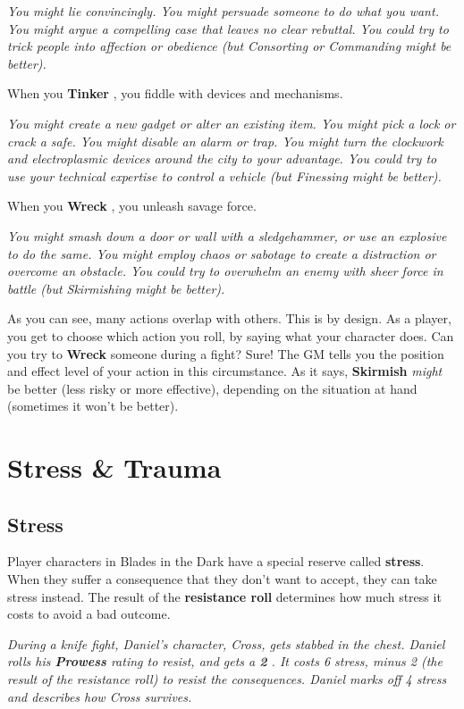 \documentclass[11pt,oneside]{book}
\newcommand{\gameterm}[1]{\textbf{#1}}
\begin{document}
\emph{You might lie convincingly. You might persuade someone to do what you want. You might argue a compelling case that leaves no clear rebuttal. You could try to trick people into affection or obedience (but Consorting or Commanding might be better).}

When you \gameterm{Tinker} , you fiddle with devices and mechanisms.

\emph{You might create a new gadget or alter an existing item. You might pick a lock or crack a safe. You might disable an alarm or trap. You might turn the clockwork and electroplasmic devices around the city to your advantage. You could try to use your technical expertise to control a vehicle (but Finessing might be better).}

When you \gameterm{Wreck} , you unleash savage force.

\emph{You might smash down a door or wall with a sledgehammer, or use an explosive to do the same. You might employ chaos or sabotage to create a distraction or overcome an obstacle. You could try to overwhelm an enemy with sheer force in battle (but Skirmishing might be better).}

As you can see, many actions overlap with others. This is by design. As a player, you get to choose which action you roll, by saying what your character does. Can you try to \gameterm{Wreck}  someone during a fight? Sure! The GM tells you the position and effect level of your action in this circumstance. As it says, \gameterm{Skirmish}  \emph{might} be better (less risky or more effective), depending on the situation at hand (sometimes it won’t be better).

\chapter{Stress \& Trauma}

\section{Stress}

Player characters in Blades in the Dark have a special reserve called \textbf{stress}. When they suffer a consequence that they don’t want to accept, they can take stress instead. The result of the \textbf{resistance roll} determines how much stress it costs to avoid a bad outcome.

\emph{During a knife fight, Daniel’s character, Cross, gets stabbed in the chest. Daniel rolls his \gameterm{Prowess}  rating to resist, and gets a \gameterm{2} . It costs 6 stress, minus 2 (the result of the resistance roll) to resist the consequences. Daniel marks off 4 stress and describes how Cross survives.}
\end{document}
